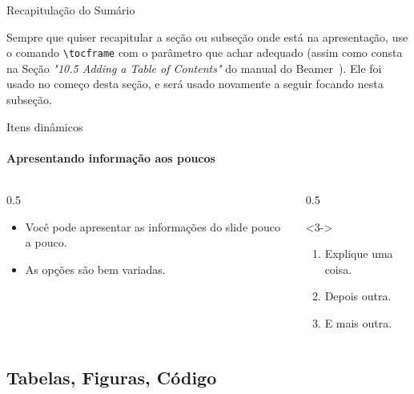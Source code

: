 \documentclass{beamer}
\begin{document}
\begin{frame}[fragile]{Recapitulação do Sumário}

    Sempre que quiser recapitular a seção ou subseção onde está na apresentação, use o comando \verb|\tocframe| com o parâmetro que achar adequado (assim como consta na Seção \textit{"10.5 Adding a Table of Contents"} do manual do Beamer~\cite{beamerclass}). Ele foi usado no começo desta seção, e será usado novamente a seguir focando nesta subseção.


\end{frame}

\tocframe[sectionstyle=show/shaded,subsectionstyle=show/shaded]

{
\specialframe
\begin{frame}{Itens dinâmicos}
    \framesubtitle{Apresentando informação aos poucos}
    \begin{columns}
        \begin{column}{0.5\textwidth}
            \begin{itemize}[<+->]
                \item Você pode apresentar as informações do slide pouco a pouco.
                \item As opções são bem variadas.
            \end{itemize}
        \end{column}
        \begin{column}{0.5\textwidth}
            \begin{block}{}<3->
                \begin{enumerate}
                    \item<3-> Explique uma coisa.
                    \item<4-| alert@4> Depois outra.
                    \item<5-> E mais outra.
                \end{enumerate}
            \end{block}
        \end{column}
    \end{columns}
\end{frame}
}

\subsection{Tabelas, Figuras, Código}
\end{document}
